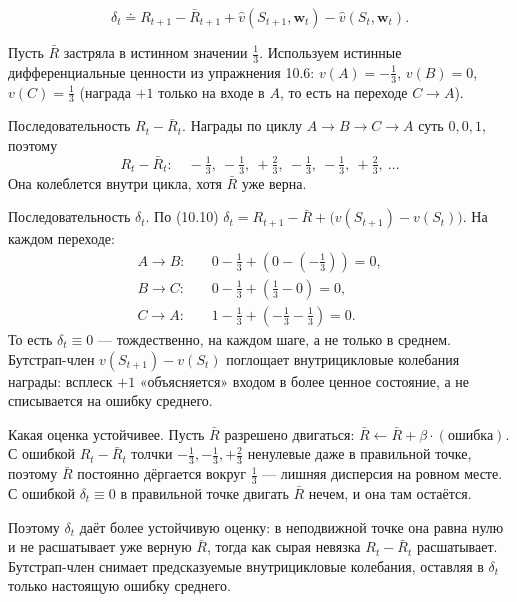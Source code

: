 \begin{equation}
    \delta_t \doteq R_{t+1} - \bar R_{t+1} + \hat v(S_{t+1}, \mathbf w_t) - \hat v(S_t, \mathbf w_t).
    \tag{10.10}
\end{equation}

\begin{solution}
    Пусть $\bar R$ застряла в истинном значении $\tfrac13$. Используем истинные
    дифференциальные ценности из упражнения 10.6: $v(A)=-\tfrac13$, $v(B)=0$,
    $v(C)=\tfrac13$ (награда $+1$ только на входе в $A$, то есть на переходе
    $C\to A$).

    Последовательность $R_t-\bar R_t$. Награды по циклу $A\to B\to C\to A$ суть
    $0,0,1$, поэтому
    \begin{equation*}
        R_t - \bar R_t:\quad -\tfrac13,\ -\tfrac13,\ +\tfrac23,\ -\tfrac13,\ -\tfrac13,\ +\tfrac23,\ \dots
    \end{equation*}
    Она колеблется внутри цикла, хотя $\bar R$ уже верна.

    Последовательность $\delta_t$. По (10.10) $\delta_t = R_{t+1}-\bar R +
    \big(v(S_{t+1})-v(S_t)\big)$. На каждом переходе:
    \begin{align*}
        A\to B:&\quad 0-\tfrac13+(0-(-\tfrac13)) = 0,\\
        B\to C:&\quad 0-\tfrac13+(\tfrac13-0) = 0,\\
        C\to A:&\quad 1-\tfrac13+(-\tfrac13-\tfrac13) = 0.
    \end{align*}
    То есть $\delta_t \equiv 0$ --- тождественно, на каждом шаге, а не только в
    среднем. Бутстрап-член $v(S_{t+1})-v(S_t)$ поглощает внутрицикловые
    колебания награды: всплеск $+1$ «объясняется» входом в более ценное состояние,
    а не списывается на ошибку среднего.

    Какая оценка устойчивее. Пусть $\bar R$ разрешено двигаться: $\bar R \leftarrow
    \bar R + \beta\cdot(\text{ошибка})$. С ошибкой $R_t-\bar R_t$ толчки
    $-\tfrac13, -\tfrac13, +\tfrac23$ ненулевые даже в правильной точке, поэтому
    $\bar R$ постоянно дёргается вокруг $\tfrac13$ --- лишняя дисперсия на ровном
    месте. С ошибкой $\delta_t\equiv 0$ в правильной точке двигать $\bar R$ нечем,
    и она там остаётся.

    Поэтому $\delta_t$ даёт более устойчивую оценку: в неподвижной точке она равна
    нулю и не расшатывает уже верную $\bar R$, тогда как сырая невязка $R_t-\bar
    R_t$ расшатывает. Бутстрап-член снимает предсказуемые внутрицикловые
    колебания, оставляя в $\delta_t$ только настоящую ошибку среднего.
\end{solution}


